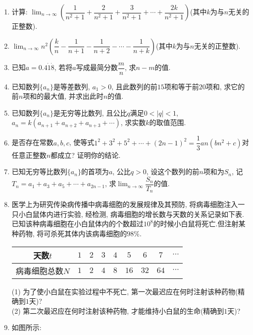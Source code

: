 \documentclass[10pt,a4paper]{article}
\begin{document}
\begin{enumerate}[1.]
\item 计算: $\displaystyle\lim_{n\to\infty}(\dfrac 1{n^2+1}+\dfrac 2{n^2+1}+\dfrac 3{n^2+1}+\cdots +\dfrac{2k}{n^2+1})$(其中$k$为与$n$无关的正整数).
\item $\displaystyle\lim_{n\to\infty}n^2(\dfrac kn-\dfrac 1{n+1}-\dfrac 1{n+2}-\cdots -\dfrac 1{n+k})$(其中$k$为与$n$无关的正整数).
\item 已知$a=0.4\dot1\dot8$, 若将$a$写成最简分数$\dfrac mn$, 求$n-m$的值.
\item 已知数列$\{a_n\}$是等差数列, $a_1>0$, 且此数列的前$15$项和等于前$20$项和, 求它的前$n$项和的最大值, 并求出此时$n$的值.
\item 已知数列$\{a_n\}$是无穷等比数列, 且公比$q$满足$0<|q|<1$, $a_n=k(a_{n+1}+a_{n+2}+a_{n+3}+\cdots)$, 求实数$k$的取值范围.
\item 是否存在常数$a,b,c$, 使等式$1^2+3^2+5^2+\cdots +(2n-1)^2=\dfrac 13an(bn^2+c)$对任意正整数$n$都成立? 证明你的结论.
\item 已知无穷等比数列$\{a_n\}$的首项为$a$, 公比$q>0$, 设这个数列的前$n$项和为$S_n$, 记$T_n=a_1+a_3+a_5+\cdots +a_{2n-1}$, 求$\displaystyle\lim_{n\to\infty}\dfrac{S_n}{T_n}$的值.
\item 医学上为研究传染病传播中病毒细胞的发展规律及其预防, 将病毒细胞注入一只小白鼠体内进行实验, 经检测, 病毒细胞的增长数与天数的关系记录如下表.已知该种病毒细胞在小白鼠体内的个数超过$10^8$的时候小白鼠将死亡.但注射某种药物, 将可杀死其体内该病毒细胞的$98\%$.
\begin{center}
    \begin{tabular}{|c|c|c|c|c|c|c|c|c|}
        \hline
        天数$t$	& $1$ & $2$ & $3$ & $4$ & $5$ & $6$ & $7$ & $\cdots$ \\ \hline
        病毒细胞总数$N$	& $1$ & $2$ & $4$ & $8$ & $16$ & $32$ & $64$ & $\cdots$ \\ \hline
    \end{tabular}
\end{center}
(1) 为了使小白鼠在实验过程中不死亡, 第一次最迟应在何时注射该种药物(精确到$1$天)?\\
(2) 第二次最迟应在何时注射该种药物, 才能维持小白鼠的生命(精确到$1$天)?
\item 如图所示:
\begin{center}
\end{center}
\end{enumerate}
\end{document}
